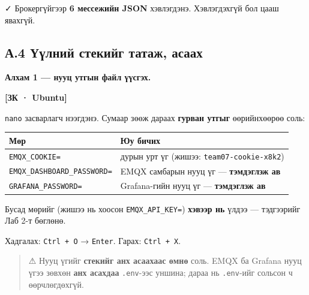 ✓ Брокергүйгээр \textbf{6 мессежийн JSON} хэвлэгдэнэ. Хэвлэгдэхгүй бол цааш явахгүй.

\hypertarget{ux430.4-ux4afux4afux43bux43dux438ux439-ux441ux442ux435ux43aux438ux439ux433-ux442ux430ux442ux430ux436-ux430ux441ux430ux430ux445}{%
\subsection{А.4 Үүлний стекийг татаж, асаах}\label{ux430.4-ux4afux4afux43bux43dux438ux439-ux441ux442ux435ux43aux438ux439ux433-ux442ux430ux442ux430ux436-ux430ux441ux430ux430ux445}}

\textbf{Алхам 1 --- нууц утгын файл үүсгэх.}

\textbf{{[}ЗК · Ubuntu{]}}

\begin{Shaded}
\begin{Highlighting}[]
\end{Highlighting}
\end{Shaded}

\texttt{nano} засварлагч нээгдэнэ. Сумаар зөөж дараах \textbf{гурван утгыг} өөрийнхөөрөө соль:

\begingroup\scriptsize\begin{longtable}[]{@{}ll@{}}
\toprule
Мөр & Юу бичих\tabularnewline
\midrule
\endhead
\texttt{EMQX\_COOKIE=} & дурын урт үг (жишээ: \texttt{team07-cookie-x8k2})\tabularnewline
\texttt{EMQX\_\allowbreak{}DASHBOARD\_\allowbreak{}PASSWORD=\allowbreak{}} & EMQX самбарын нууц үг --- \textbf{тэмдэглэж ав}\tabularnewline
\texttt{GRAFANA\_\allowbreak{}PASSWORD=\allowbreak{}} & Grafana-гийн нууц үг --- \textbf{тэмдэглэж ав}\tabularnewline
\bottomrule
\end{longtable}\endgroup

Бусад мөрийг (жишээ нь хоосон \texttt{EMQX\_\allowbreak{}API\_\allowbreak{}KEY=\allowbreak{}}) \textbf{хэвээр нь} үлдээ --- тэдгээрийг Лаб 2-т бөглөнө.

Хадгалах: \texttt{Ctrl\ +\ O} → \texttt{Enter}. Гарах: \texttt{Ctrl\ +\ X}.

\begin{quote}
⚠ Нууц үгийг \textbf{стекийг анх асаахаас өмнө} соль. EMQX ба Grafana нууц үгээ зөвхөн \textbf{анх асахдаа} \texttt{.env}-ээс уншина; дараа нь \texttt{.env}-ийг сольсон ч өөрчлөгдөхгүй.
\end{quote}

